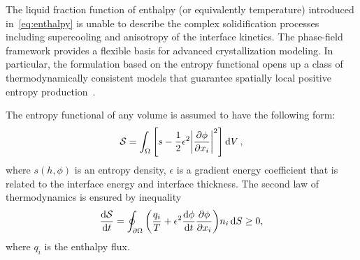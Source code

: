 \documentclass{article}
\begin{document}
The liquid fraction function of enthalpy (or equivalently temperature) introduced in~\eqref{eq:enthalpy} is unable
to describe the complex solidification processes including supercooling and anisotropy of the interface kinetics.
The phase-field framework provides a flexible basis for advanced crystallization modeling.
In particular, the formulation based on the entropy functional opens up a class of thermodynamically consistent models
that guarantee spatially local positive entropy production~\cite{Wheeler1993}.

The entropy functional of any volume is assumed to have the following form:
\begin{equation}\label{eq:entropy}
    \mathcal{S} = \int_\Omega \qty[ s - \frac12\epsilon^2\qty|\pdv{\phi}{x_i}|^2 ] \dd{V},
\end{equation}
where \(s(h,\phi)\) is an entropy density, \(\epsilon\) is a gradient energy coefficient
that is related to the interface energy and interface thickness.
The second law of thermodynamics is ensured by inequality
\begin{equation}\label{eq:second_law}
    \dv{\mathcal{S}}{t} = \oint_{\partial\Omega} \qty( \frac{q_i}{T} + \epsilon^2\dv{\phi}{t}\pdv{\phi}{x_i} ) n_i\dd{S} \geq 0,
\end{equation}
where \(q_i\) is the enthalpy flux.
\end{document}
